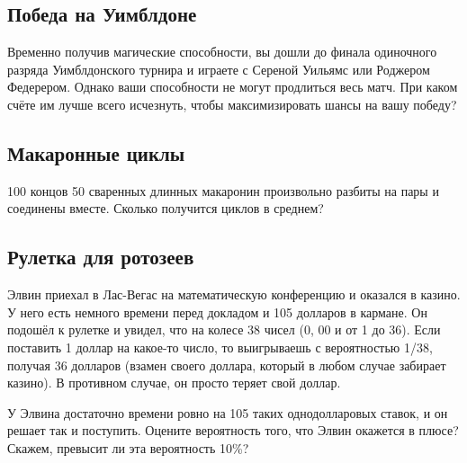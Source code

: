 \subsection*{Победа на Уимблдоне}

Временно получив магические способности, вы дошли до финала одиночного разряда Уимблдонского турнира и играете с Сереной Уильямс или Роджером Федерером.
Однако ваши способности не могут продлиться весь матч.
При каком счёте им лучше всего исчезнуть, чтобы максимизировать шансы на вашу победу?


\subsection*{Макаронные циклы}

100 концов 50 сваренных длинных макаронин произвольно разбиты на пары и соединены вместе.
Сколько получится циклов в среднем?

\subsection*{Рулетка для ротозеев}

Элвин приехал в Лас-Вегас на математическую конференцию и оказался в казино.
У него есть немного времени перед докладом и 105 долларов в кармане.
Он подошёл к рулетке и увидел, что на колесе 38 чисел (0, 00 и от 1 до 36).
Если поставить 1 доллар на какое-то число, то выигрываешь с вероятностью 1/38, получая 36 долларов (взамен своего доллара, который в любом случае забирает казино).
В противном случае, он просто теряет свой доллар.

У Элвина достаточно времени ровно на 105 таких однодолларовых ставок, и он решает так и поступить.
Оцените вероятность того, что Элвин окажется в плюсе?
Скажем, превысит ли эта вероятность 10\%?
